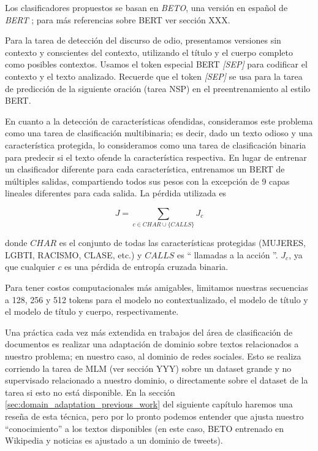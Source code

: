 Los clasificadores propuestos se basan en \emph{BETO}\cite{canete2020spanish}, una versión en español de \emph{BERT} \cite{devlin2018bert}; para más referencias sobre BERT ver sección XXX.

Para la tarea de detección del discurso de odio, presentamos versiones sin contexto y conscientes del contexto, utilizando el título y el cuerpo completo como posibles contextos. Usamos el token especial BERT \emph {[SEP]} para codificar el contexto y el texto analizado. Recuerde que el token \emph {[SEP]} se usa para la tarea de predicción de la siguiente oración (tarea NSP) en el preentrenamiento al estilo BERT.

En cuanto a la detección de características ofendidas, consideramos este problema como una tarea de clasificación multibinaria; es decir, dado un texto odioso y una característica protegida, lo consideramos como una tarea de clasificación binaria para predecir si el texto ofende la característica respectiva. En lugar de entrenar un clasificador diferente para cada característica, entrenamos un BERT de múltiples salidas, compartiendo todos sus pesos con la excepción de 9 capas lineales diferentes para cada salida. La pérdida utilizada es

\begin{equation*}
    J = \sum\limits_{c \in CHAR \cup \{CALLS\}} J_c
\end{equation*}

donde $CHAR$ es el conjunto de todas las características protegidas (MUJERES, LGBTI, RACISMO, CLASE, etc.) y $CALLS$ es `` llamadas a la acción ''. $ J_c $, ya que cualquier $ c $ es una pérdida de entropía cruzada binaria.

Para tener costos computacionales más amigables, limitamos nuestras secuencias a 128, 256 y 512 tokens para el modelo no contextualizado, el modelo de título y el modelo de título y cuerpo, respectivamente.

Una práctica cada vez más extendida en trabajos del área de clasificación de documentos es realizar una adaptación de dominio sobre textos relacionados a nuestro problema; en nuestro caso, al dominio de redes sociales. Esto se realiza corriendo la tarea de MLM (ver sección YYY) sobre un dataset grande y no supervisado relacionado a nuestro dominio, o directamente sobre el dataset de la tarea si esto no está disponible. En la sección \ref{sec:domain_adaptation_previous_work} del siguiente capítulo haremos una reseña de esta técnica, pero por lo pronto podemos entender que ajusta nuestro ``conocimiento'' a los textos disponibles (en este caso, BETO entrenado en Wikipedia y noticias es ajustado a un dominio de tweets).


